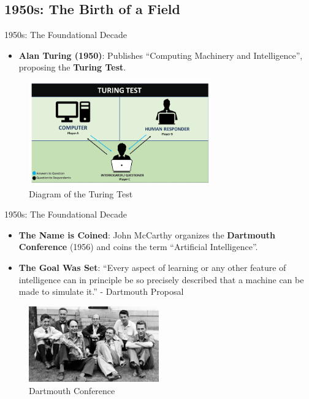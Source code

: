 \documentclass{beamer}
\begin{document}
\subsection{1950s: The Birth of a Field}

\begin{frame}[t]{1950s: The Foundational Decade}
    \begin{itemize}
        \item \textbf{Alan Turing (1950)}: Publishes ``Computing Machinery and Intelligence'', proposing the \textbf{Turing Test}.
    \end{itemize}
    \begin{figure}
        \includegraphics[width=0.7\textwidth]{images/turing-test.png}
        \caption{Diagram of the Turing Test}
    \end{figure}
\end{frame}

\begin{frame}[t]{1950s: The Foundational Decade}
    \begin{itemize}
        \item \textbf{The Name is Coined}: John McCarthy organizes the \textbf{Dartmouth Conference} (1956) and coins the term ``Artificial Intelligence''.
    \item \textbf{The Goal Was Set}: ``Every aspect of learning or any other feature of intelligence can in principle be so precisely described that a machine can be made to simulate it.'' - Dartmouth Proposal
    \end{itemize}
    \begin{figure}
        \includegraphics[width=0.5\textwidth]{images/Dartmouth-1956-Conference.jpg}
        \caption{Dartmouth Conference}
    \end{figure}

\end{frame}
\end{document}
